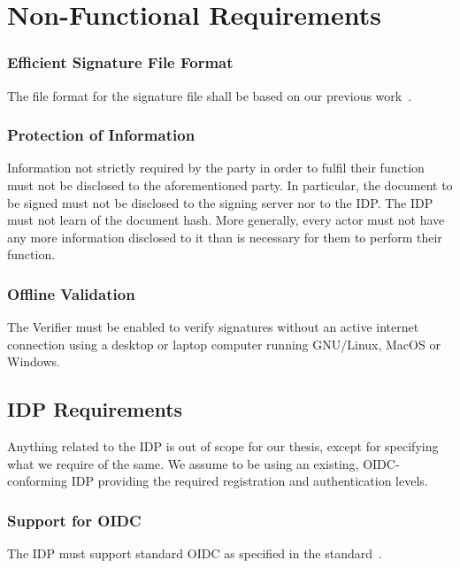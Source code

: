\chapter{Non-Functional Requirements}
\label{ch:nonfunctionalrequirements}

\subsection{Efficient Signature File Format}\label{subsec:efficient-signature-file-format}
The file format for the signature file shall be based on our previous work~\cite{projekt2}.

\subsection{Protection of Information}\label{subsec:protection-of-information}
Information not strictly required by the party in order to fulfil their function must not be disclosed to the aforementioned party.
In particular, the document to be signed must not be disclosed to the signing server nor to the \gls{IDP}.
The \gls{IDP} must not learn of the document hash.
More generally, every actor must not have any more information disclosed to it than is necessary for them to perform their function.

\subsection{Offline Validation}\label{subsec:offline-validation}
The Verifier must be enabled to verify signatures without an active internet connection using a desktop or laptop computer running GNU/Linux, MacOS or Windows.

\section{IDP Requirements}\label{sec:idp-requirements}
Anything related to the \gls{IDP} is out of scope for our thesis, except for specifying what we require of the same.
We assume to be using an existing, \gls{OIDC}-conforming \gls{IDP} providing the required registration and authentication levels.

\subsection{Support for OIDC}\label{subsec:support-for-oidc}
The \gls{IDP} must support standard \gls{OIDC} as specified in the standard~\cite{oidc}.


